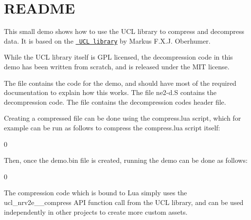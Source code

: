 \chapter{README}
\hypertarget{md_ucl-demo_2README}{}\label{md_ucl-demo_2README}
This small demo shows how to use the UCL library to compress and decompress data. It is based on the \href{http://www.oberhumer.com/opensource/ucl/}{\texttt{ UCL library}} by Markus F.\+X.\+J. Oberhumer.

While the UCL library itself is GPL licensed, the decompression code in this demo has been written from scratch, and is released under the MIT license.

The file {\ttfamily {}} contains the code for the demo, and should have most of the required documentation to explain how this works. The file {\ttfamily ne2-\/d.\+S} contains the decompression code. The file {\ttfamily {}} contains the decompression code\textquotesingle{}s header file.

Creating a compressed file can be done using the {\ttfamily compress.\+lua} script, which for example can be run as follows to compress the {\ttfamily compress.\+lua} script itself\+:


\begin{DoxyCode}{0}

\end{DoxyCode}


Then, once the demo.\+bin file is created, running the demo can be done as follows\+:


\begin{DoxyCode}{0}

\end{DoxyCode}


The compression code which is bound to Lua simply uses the {\ttfamily ucl\+\_\+nrv2e\+\_\+\_\+compress} API function call from the UCL library, and can be used independently in other projects to create more custom assets. 